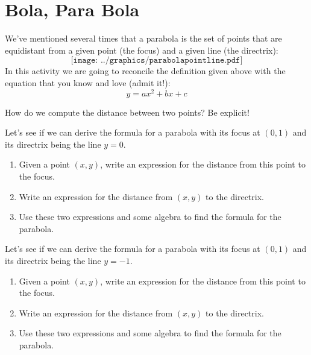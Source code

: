 \newpage
\section{Bola, Para Bola}           
We've mentioned several times that a parabola is the set of points
that are equidistant from a given point (the focus) and a given line
(the directrix):
\[
\texttt{[image: ../graphics/parabolapointline.pdf]}
\]
In this activity we are going to reconcile the definition given
above with the equation that you know and love (admit it!):
\[
y = ax^2 + bx + c
\]

\begin{prob}
How do we compute the distance between two points? Be explicit!
\end{prob}

\begin{prob}
Let's see if we can derive the formula for a parabola with its focus at $(0,1)$ and its directrix being the line $y=0$.
\begin{enumerate}
\item Given a point $(x,y)$, write an expression for the distance from this point to the focus.
\item Write an expression for the distance from $(x,y)$ to the directrix. 
\item Use these two expressions and some algebra to find the formula for the parabola. 
\end{enumerate}
\end{prob}

\begin{prob}
Let's see if we can derive the formula for a parabola with its focus at $(0,1)$ and its directrix being the line $y=-1$.
\begin{enumerate}
\item Given a point $(x,y)$, write an expression for the distance from this point to the focus.
\item Write an expression for the distance from $(x,y)$ to the directrix. 
\item Use these two expressions and some algebra to find the formula for the parabola. 
\end{enumerate}
\end{prob}


